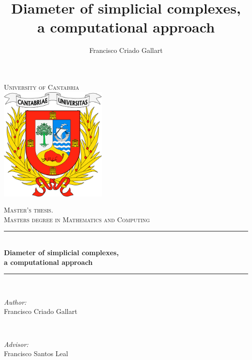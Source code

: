 \documentclass[12pt,a4paper]{article}
\title{ Diameter of simplicial complexes, \\ a computational approach}
\author{Francisco Criado Gallart}
\date{}
\theoremstyle{plain}
\theoremstyle{definition}
\begin{document}

\setlength{\parindent}{4ex}

\thispagestyle{plain}

\begin{titlepage}

\newcommand{\HRule}{\rule{\linewidth}{0.5mm}} %

\center %
 

\textsc{\LARGE University of Cantabria}\\[1.5cm] %

\includegraphics[width=0.4\textwidth]{img/logo_UC.png}

\textsc{\Large Master's thesis.}\\[0.5cm] %
\textsc{\large Masters degree in Mathematics and Computing}\\[0.5cm] %


\HRule \\[0.4cm]
{ \huge \bfseries Diameter of simplicial complexes, \\ a computational approach}\\[0.4cm] %
\HRule \\[1.5cm]
 


\begin{minipage}{0.4\textwidth}
\begin{flushleft} \large
\emph{Author:}\\
Francisco Criado Gallart  %
\end{flushleft}
\end{minipage}
~
\begin{minipage}{0.5\textwidth}
\begin{flushright} \large
\emph{Advisor:} \\
Francisco Santos Leal %
\end{flushright}
\end{minipage}\\[4cm]


\end{titlepage}
\end{document}

